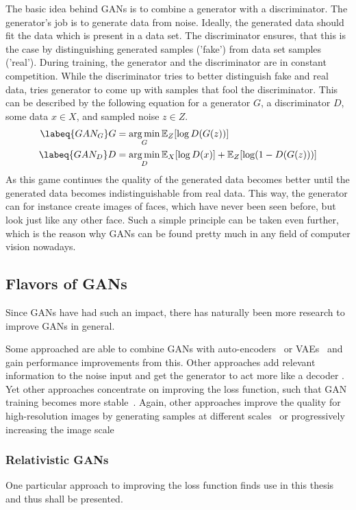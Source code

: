 The basic idea behind GANs is to combine a generator with a discriminator.
The generator's job is to generate data from noise.
Ideally, the generated data should fit the data which is present in a data set.
The discriminator ensures, that this is the case by distinguishing generated samples ('fake') from data set samples ('real').
During training, the generator and the discriminator are in constant competition.
While the discriminator tries to better distinguish fake and real data, tries generator to come up with samples that fool the discriminator.
This can be described by the following equation for a generator $G$, a discriminator $D$, some data $x \in X$, and sampled noise $z \in Z$.
\begin{align}
    \labeq{GAN_G}
    G & = \argmin_G \E_Z[\log D(G(z))] \\
    \labeq{GAN_D}
    D & = \argmin_D \E_X[\log D(x)] + \E_Z[\log( 1 - D(G(z)))]
\end{align}
As this game continues the quality of the generated data becomes better until the generated data becomes indistinguishable from real data.
This way, the generator can for instance create images of faces, which have never been seen before, but look just like any other face.
Such a simple principle can be taken even further, which is the reason why GANs can be found pretty much in any field of computer vision nowadays.

\subsection{Flavors of GANs}
Since GANs have had such an impact, there has naturally been more research to improve GANs in general.

Some approached are able to combine GANs with auto-encoders~\cite{AEGAN} or VAEs~\cite{VAE-GAN} and gain performance improvements from this.
Other approaches add relevant information to the noise input and get the generator to act more like a decoder \cite{cGAN}.
Yet other approaches concentrate on improving the loss function, such that GAN training becomes more stable~\cite{WGAN}.
Again, other approaches improve the quality for high-resolution images by generating samples at different scales~\cite{MSG-GAN} or progressively increasing the image scale~\cite{ProGAN, StyleGAN}

\subsubsection{Relativistic GANs}
One particular approach to improving the loss function finds use in this thesis and thus shall be presented.

